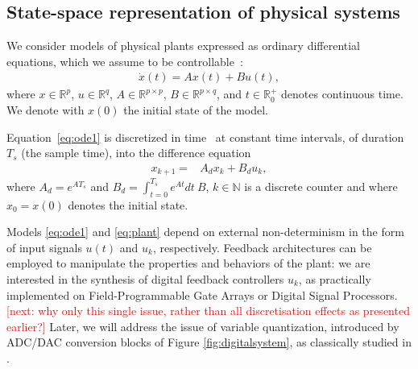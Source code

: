 \documentclass[twocolumn]{autart}    %
\newcommand{\mat}[1]{{#1}}
\renewcommand{\vec}[1]{{#1}}
\renewcommand{\note}[1]{\textcolor{red}{[#1]}}
\begin{document}

\subsection{State-space representation of physical systems}
\label{sec:model}

We consider models of physical plants expressed as ordinary differential
equations, which we assume to be controllable~\cite{Astrom08}: 
%
\begin{align}
\label{eq:ode1}
\dot{x}(t) = \mat{A}\vec{x}(t)+ \mat{B} \vec{u}(t), 
\end{align}
%
where 
$\vec{x} \in \mathbb{R}^p$,  
$\vec{u} \in \mathbb{R}^q$, 
$\mat{A} \in \mathbb{R}^{p \times p}$, 
$\mat{B} \in \mathbb{R}^{p \times q}$,
and $t \in \mathbb R_0^+$ denotes continuous time. 
We denote with $x(0)$ the initial state of the model.

Equation~\eqref{eq:ode1} is 
discretized in time~\cite{middleton1990digital,van1978computing} at constant time intervals,
of duration $T_s$ (the sample time), 
into the difference equation
%
\begin{align}
\label{eq:plant}
\vec{x}_{k+1} =& \mat{A}_d \vec{x}_k+ \mat{B}_d \vec{u}_k, 
\end{align} 
where 
$\mat{A}_d=e^{\mat{A}T_s}$ and 
$\mat{B}_d = \int_{t = 0}^{T_s} e^{\mat{A} t} dt\ \mat{B}$, 
$k \in \mathbb N$ is a discrete counter and where $\vec{x}_{0}=\vec{x}(0)$ denotes the initial state.  

Models \eqref{eq:ode1} and \eqref{eq:plant} depend on external non-determinism in the form of input signals $u (t)$ and  $u_k$, respectively. 
Feedback architectures can be employed to manipulate the properties and behaviors of the plant:    
we are interested in the synthesis of digital feedback controllers $u_k$,  
as practically implemented on Field-Programmable Gate Arrays or Digital Signal Processors. 
\note{next: why only this single issue, rather than all discretisation effects as presented earlier?} Later, we will address the issue of variable quantization, 
introduced by ADC/DAC conversion blocks of Figure \ref{fig:digitalsystem}, 
as classically studied in \cite{astrom1997computer}. 
\end{document}
